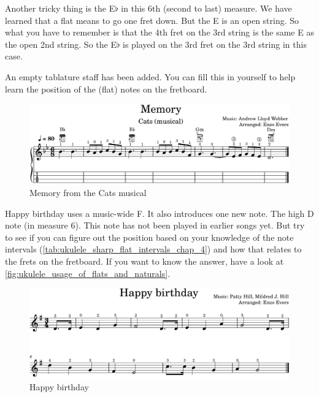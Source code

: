 Another tricky thing is the E$\flat$ in this 6th (second to last) measure. We have learned that a flat means to go one fret down. But the E is an open string. So what you have to remember is that the 4th fret on the 3rd string is the same E as the open 2nd string. So the E$\flat$ is played on the 3rd fret on the 3rd string in this case. 

An empty tablature staff has been added. You can fill this in yourself to help learn the position of the (flat) notes on the fretboard.

\begin{figure}[h]
	\centering
	\includegraphics[width=\textwidth]{../../MuseScore/Ukulele/UkuleleMemoryCats.png}
	\caption{Memory from the Cats musical}
	\label{fig:ukulele_memory_cats}
\end{figure}

Happy birthday uses a music-wide F\sharp. It also introduces one new note. The high D note (in measure 6). This note has not been played in earlier songs yet. But try to see if you can figure out the position based on your knowledge of the note intervals (\autoref{tab:ukulele_sharp_flat_intervals_chap_4}) and how that relates to the frets on the fretboard. If you want to know the answer, have a look at \autoref{fig:ukulele_usage_of_flats_and_naturals}.

\begin{figure}[h]
	\centering
	\includegraphics[width=\textwidth]{../../MuseScore/Ukulele/UkuleleHappyBirthday.png}
	\caption{Happy birthday}
	\label{fig:ukulele_happy_birthday}
\end{figure}

\newpage

